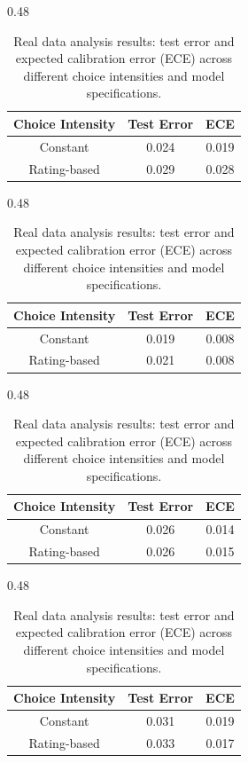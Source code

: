 \documentclass[12pt]{amsart}
\theoremstyle{plain}
\theoremstyle{remark}
\numberwithin{equation}{section}
\begin{document}
\begin{table}[t]
\centering
\renewcommand{\arraystretch}{0.75}

\begin{subtable}{0.48\textwidth}
\setlength{\tabcolsep}{10pt}
\begin{tabular}{ccc}
\toprule
Choice Intensity & Test Error & ECE \\
\midrule
Constant  & 0.024 & 0.019\\
Rating-based  & 0.029 & 0.028\\
\bottomrule
\end{tabular}
\centering
\caption*{\centering Model (a)}
\end{subtable}
\hfill
\begin{subtable}{0.48\textwidth}
\setlength{\tabcolsep}{10pt}
\begin{tabular}{ccc}
\toprule
Choice Intensity & Test Error & ECE \\
\midrule
Constant  & 0.019 & 0.008\\
Rating-based  & 0.021 & 0.008\\
\bottomrule
\end{tabular}
\centering
\caption*{\centering Model (b)}
\end{subtable}

\vspace{0.4cm}

\begin{subtable}{0.48\textwidth}
\setlength{\tabcolsep}{10pt}
\begin{tabular}{ccc}
\toprule
Choice Intensity & Test Error & ECE \\
\midrule
Constant  & 0.026 & 0.014 \\
Rating-based  & 0.026 & 0.015 \\
\bottomrule
\end{tabular}
\centering
\caption*{\centering Model (c)}
\end{subtable}
\hfill
\begin{subtable}{0.48\textwidth}
\setlength{\tabcolsep}{10pt}
\begin{tabular}{ccc}
\toprule
Choice Intensity & Test Error & ECE \\
\midrule
Constant  & 0.031 & 0.019 \\
Rating-based  & 0.033 & 0.017 \\
\bottomrule
\end{tabular}
\centering
\caption*{\centering Model (d)}
\end{subtable}
\centering
\caption{\centering Real data analysis results: test error and expected calibration error (ECE) across different choice intensities and model specifications.}
\label{tab:real}
\end{table}
\end{document}

